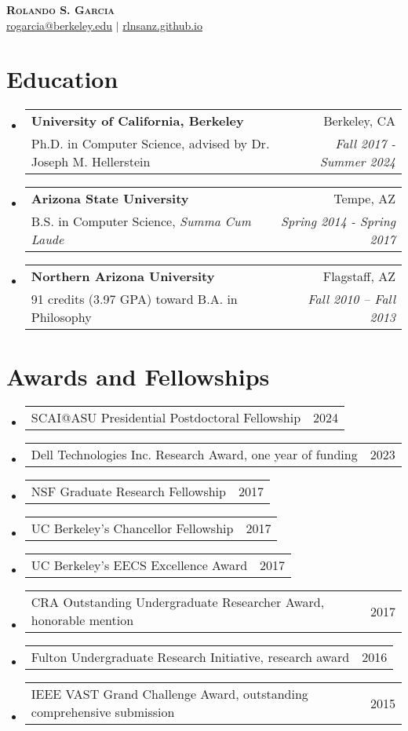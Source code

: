 \documentclass[letterpaper,11pt]{article}
\makeatletter
\newcommand{\resumeSubheading}[4]{
  \vspace{-2pt}\item
    \begin{tabular*}{0.97\textwidth}[t]{l@{\extracolsep{\fill}}r}
      \textbf{#1} & #2 \\
      \small#3 & \textit{\small #4} \\
    \end{tabular*}\vspace{-7pt}
}
\newcommand{\resumeSubSubheading}[2]{
    \item
    \begin{tabular*}{0.97\textwidth}{l@{\extracolsep{\fill}}r}
      #1 & #2 \\
    \end{tabular*}\vspace{-7pt}
}
\newcommand{\resumeSubHeadingListStart}{\begin{itemize}[leftmargin=0.15in, label={}]}
\newcommand{\resumeSubHeadingListEnd}{\end{itemize}}
\makeatother
\begin{document}

\begin{center}
  \textbf{\Huge \scshape Rolando S. Garcia} \\ \vspace{1pt}
  \href{mailto:rogarcia@berkeley.edu}{rogarcia@berkeley.edu} $|$
  \href{https://rlnsanz.github.io}{rlnsanz.github.io} \\ \vspace{1pt}
\end{center}


\section{Education}
\resumeSubHeadingListStart
\resumeSubheading
{University of California, Berkeley}{Berkeley, CA}
{Ph.D. in Computer Science, advised by Dr. Joseph M. Hellerstein}{Fall 2017 - Summer 2024}
\resumeSubheading
{Arizona State University}{Tempe, AZ}
{B.S. in Computer Science, \textit{Summa Cum Laude}}{Spring 2014 - Spring 2017}
\resumeSubheading
{Northern Arizona University}{Flagstaff, AZ}
{91 credits (3.97 GPA) toward B.A. in Philosophy}{Fall 2010 -- Fall 2013}
\resumeSubHeadingListEnd

\section{Awards and Fellowships}
\resumeSubHeadingListStart
\resumeSubSubheading
{SCAI@ASU Presidential Postdoctoral Fellowship}{2024}
\resumeSubSubheading
{Dell Technologies Inc. Research Award, one year of funding}{2023}
\resumeSubSubheading
{NSF Graduate Research Fellowship}{2017}
\resumeSubSubheading
{UC Berkeley's Chancellor Fellowship}{2017}
\resumeSubSubheading
{UC Berkeley's EECS Excellence Award}{2017}
\resumeSubSubheading
{CRA Outstanding Undergraduate Researcher Award, honorable mention}{2017}
\resumeSubSubheading
{Fulton Undergraduate Research Initiative, research award}{2016}
\resumeSubSubheading
{IEEE VAST Grand Challenge Award, outstanding comprehensive submission}{2015}
\resumeSubHeadingListEnd
\end{document}
